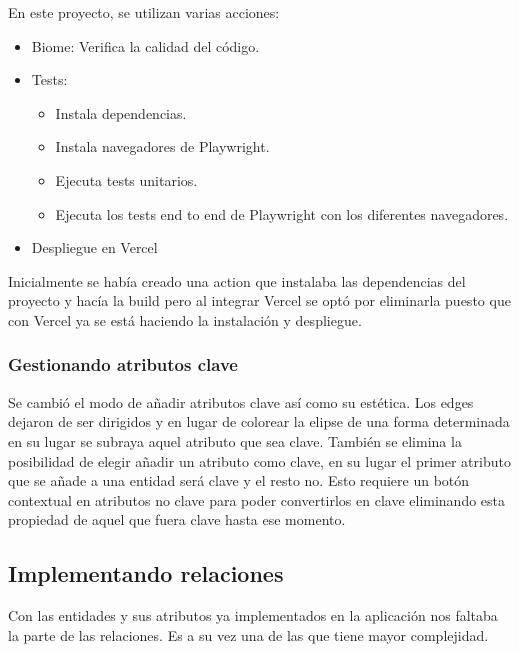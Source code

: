 En este proyecto, se utilizan varias acciones:
\begin{itemize}
\tightlist
    \item Biome: Verifica la calidad del código.
    \item Tests: 
    \begin{itemize}
        \tightlist
        \item Instala dependencias.
        \item Instala navegadores de Playwright.
        \item Ejecuta tests unitarios.
        \item Ejecuta los tests end to end de Playwright con los diferentes navegadores.
    \end{itemize}
    \item Despliegue en Vercel
\end{itemize}

Inicialmente se había creado una action que instalaba las dependencias del proyecto y hacía la build pero al integrar Vercel se optó por eliminarla puesto que con Vercel ya se está haciendo la instalación y despliegue.



\subsubsection{Gestionando atributos clave}
Se cambió el modo de añadir atributos clave así como su estética. Los edges dejaron de ser dirigidos y en lugar de colorear la elipse de una forma determinada en su lugar se subraya aquel atributo que sea clave.
También se elimina la posibilidad de elegir añadir un atributo como clave, en su lugar el primer atributo que se añade a una entidad será clave y el resto no. Esto requiere un botón contextual en atributos no clave para poder convertirlos en clave eliminando esta propiedad de aquel que fuera clave hasta ese momento.

\subsection{Implementando relaciones}
Con las entidades y sus atributos ya implementados en la aplicación nos faltaba la parte de las relaciones. Es a su vez una de las que tiene mayor complejidad.

